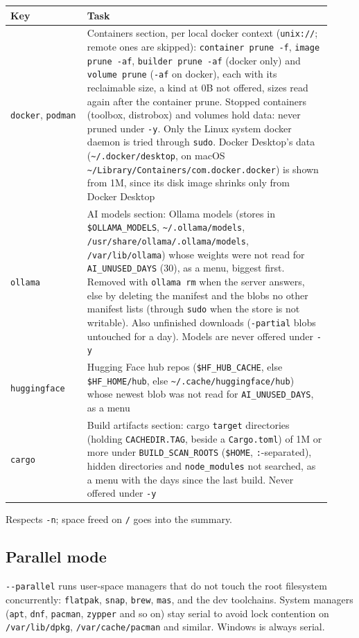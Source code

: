 \documentclass[11pt,a4paper]{article}
\begin{document}
\begin{longtable}{@{}p{0.22\linewidth} p{0.70\linewidth}@{}}
\toprule
\textbf{Key} & \textbf{Task} \\
\midrule \endhead
\texttt{docker}, \texttt{podman} & Containers section, per local docker
      context (\texttt{unix://}; remote ones are skipped): \texttt{container prune -f}, \texttt{image prune -af},
      \texttt{builder prune -af} (docker only) and \texttt{volume prune}
      (\texttt{-af} on docker), each with its reclaimable size, a kind at
      0B not offered, sizes read again after the container prune. Stopped
      containers (toolbox, distrobox) and volumes hold data: never pruned
      under \texttt{-y}. Only the Linux system docker daemon is tried
      through \texttt{sudo}. Docker Desktop's data
      (\verb|~/.docker/desktop|, on macOS
      \verb|~/Library/Containers/com.docker.docker|) is shown from 1M,
      since its disk image shrinks only from Docker Desktop \\
\texttt{ollama} & AI models section: Ollama models (stores in
      \verb|$OLLAMA_MODELS|, \verb|~/.ollama/models|,
      \verb|/usr/share/ollama/.ollama/models|, \verb|/var/lib/ollama|)
      whose weights were not read for \texttt{AI\_UNUSED\_DAYS} (30), as a
      menu, biggest first. Removed with \texttt{ollama rm} when the server
      answers, else by deleting the manifest and the blobs no other
      manifest lists (through \texttt{sudo} when the store is not
      writable). Also unfinished downloads (\texttt{-partial} blobs
      untouched for a day). Models are never offered under \texttt{-y} \\
\texttt{huggingface} & Hugging Face hub repos (\verb|$HF_HUB_CACHE|, else
      \verb|$HF_HOME/hub|, else \verb|~/.cache/huggingface/hub|) whose
      newest blob was not read for \texttt{AI\_UNUSED\_DAYS}, as a menu \\
\texttt{cargo} & Build artifacts section: cargo \texttt{target}
      directories (holding \texttt{CACHEDIR.TAG}, beside a
      \texttt{Cargo.toml}) of 1M or more under \texttt{BUILD\_SCAN\_ROOTS}
      (\verb|$HOME|, \texttt{:}-separated), hidden directories and
      \texttt{node\_modules} not searched, as a menu with the days since
      the last build. Never offered under \texttt{-y} \\
\bottomrule
\end{longtable}

Respects \texttt{-n}; space freed on \texttt{/} goes into the summary.

\subsection{Parallel mode}
\texttt{-{}-parallel} runs user-space managers that do not touch the root
filesystem concurrently: \texttt{flatpak}, \texttt{snap}, \texttt{brew},
\texttt{mas}, and the dev toolchains. System managers (\texttt{apt},
\texttt{dnf}, \texttt{pacman}, \texttt{zypper} and so on) stay serial to
avoid lock contention on \texttt{/var/lib/dpkg}, \texttt{/var/cache/pacman}
and similar. Windows is always serial.
\end{document}

